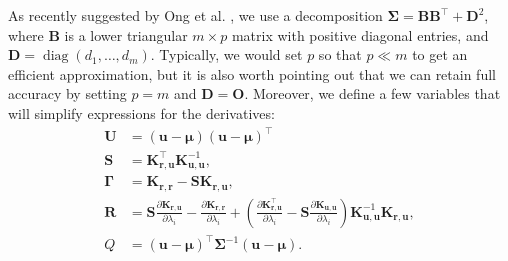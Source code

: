 \documentclass{mpaper}
\DeclareMathOperator{\diag}{diag}
\newcommand{\Kuu}{\mathbf{K}_{\mathbf{u},\mathbf{u}}}
\newcommand{\Krr}{\mathbf{K}_{\mathbf{r},\mathbf{r}}}
\newcommand{\Kru}{\mathbf{K}_{\mathbf{r},\mathbf{u}}}
\begin{document}
As recently suggested by Ong et al. \cite{ong2018gaussian}, we use a
decomposition $\bm\Sigma = \mathbf{B}\mathbf{B}^\intercal + \mathbf{D}^2$, where
$\mathbf{B}$ is a lower triangular $m \times p$ matrix with positive diagonal
entries, and $\mathbf{D} = \diag(d_1, \dots, d_m)$. Typically, we would set $p$
so that $p \ll m$ to get an efficient approximation, but it is also worth
pointing out that we can retain full accuracy by setting $p = m$ and $\mathbf{D}
= \mathbf{O}$. Moreover, we define a few variables that will simplify
expressions for the derivatives:
\begin{align*}
  \mathbf{U} &= (\mathbf{u} - \bm\mu)(\mathbf{u} - \bm\mu)^\intercal \\
  \mathbf{S} &= \Kru^\intercal\Kuu^{-1}, \\
  \bm\Gamma &= \Krr - \mathbf{S}\Kru, \\
  \mathbf{R} &= \mathbf{S}\frac{\partial \Kru}{\partial \lambda_i} - \frac{\partial \Krr}{\partial \lambda_i} + \left( \frac{\partial \Kru^\intercal}{\partial \lambda_i} - \mathbf{S}\frac{\partial \Kuu}{\partial \lambda_i} \right) \Kuu^{-1}\Kru, \\
  Q &= (\mathbf{u} - \bm\mu)^\intercal\bm\Sigma^{-1}(\mathbf{u} - \bm\mu).
\end{align*}
\end{document}

